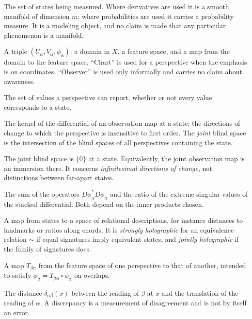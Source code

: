 \documentclass[11pt]{article}
\theoremstyle{remark}
\begin{document}
\begin{description}[leftmargin=1.2em,style=nextline,itemsep=3pt]
\item[State space $X$.] The set of states being measured. Where derivatives are used it is a smooth manifold of dimension $m$; where probabilities are used it carries a probability measure. It is a modeling object, and no claim is made that any particular phenomenon is a manifold.
\item[Perspective, chart, observation map.] A triple $(U_\alpha,V_\alpha,\phi_\alpha)$: a domain in $X$, a feature space, and a map from the domain to the feature space. ``Chart'' is used for a perspective when the emphasis is on coordinates. ``Observer'' is used only informally and carries no claim about awareness.
\item[Feature space.] The set of values a perspective can report, whether or not every value corresponds to a state.
\item[Blind space.] The kernel of the differential of an observation map at a state: the directions of change to which the perspective is insensitive to first order. The \emph{joint} blind space is the intersection of the blind spaces of all perspectives containing the state.
\item[Multidifference completeness.] The joint blind space is $\{0\}$ at a state. Equivalently, the joint observation map is an immersion there. It concerns \emph{infinitesimal directions of change}, not distinctions between far-apart states.
\item[Frame operator and condition number.] The sum of the operators $D\phi_\alpha^{*}D\phi_\alpha$ and the ratio of the extreme singular values of the stacked differential. Both depend on the inner products chosen.
\item[Signature.] A map from states to a space of relational descriptions, for instance distances to landmarks or ratios along chords. It is \emph{strongly holographic} for an equivalence relation $\sim$ if equal signatures imply equivalent states, and \emph{jointly holographic} if the family of signatures does.
\item[Transition map.] A map $T_{\beta\alpha}$ from the feature space of one perspective to that of another, intended to satisfy $\phi_\beta=T_{\beta\alpha}\circ\phi_\alpha$ on overlaps.
\item[Transition discrepancy.] The distance $\delta_{\alpha\beta}(x)$ between the reading of $\beta$ at $x$ and the translation of the reading of $\alpha$. A discrepancy is a measurement of disagreement and is not by itself an error.

\end{description}
\end{document}
